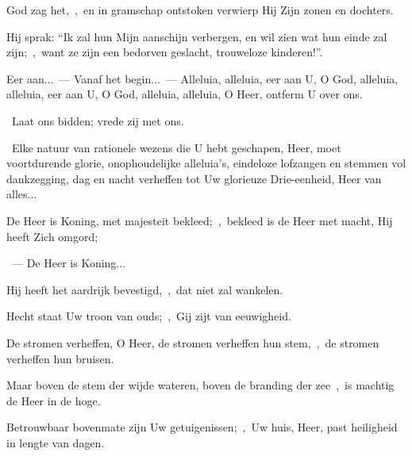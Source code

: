 \documentclass[12pt,twoside,a5paper]{article}
\begin{document}
\begin{halfparskip}

  God zag het,~\sep\ en in gramschap ontstoken verwierp Hij Zijn zonen en dochters.

  Hij sprak: ``Ik zal hun Mijn aanschijn verbergen, en wil zien wat hun einde zal zijn;~\sep\ want ze zijn een bedorven geslacht, trouweloze kinderen!''.
\end{halfparskip}


\begin{halfparskip}
  Eer aan...~--- Vanaf het begin...~--- Alleluia, alleluia, eer aan U, O God, alleluia, alleluia, eer aan U, O God, alleluia, alleluia, O Heer, ontferm U over ons.

  \dd~Laat ons bidden; vrede zij met ons.

  \cc~Elke natuur van rationele wezens die U hebt geschapen, Heer, moet voortdurende glorie, onophoudelijke alleluia's, eindeloze lofzangen en stemmen vol dankzegging, dag en nacht verheffen tot Uw glorieuze Drie-eenheid, Heer van alles...
\end{halfparskip}



\begin{halfparskip}
  De Heer is Koning, met majesteit bekleed;~\sep\ bekleed is de Heer met macht, Hij heeft Zich omgord;

  ~---  De Heer is Koning...

  Hij heeft het aardrijk bevestigd,~\sep\ dat niet zal wankelen.

  Hecht staat Uw troon van ouds;~\sep\ Gij zijt van eeuwigheid.

  De stromen verheffen, O Heer, de stromen verheffen hun stem,~\sep\ de stromen verheffen hun bruisen.

  Maar boven de stem der wijde wateren, boven de branding der zee~\sep\ is machtig de Heer in de hoge.

  Betrouwbaar bovenmate zijn Uw getuigenissen;~\sep\ Uw huis, Heer, past heiligheid in lengte van dagen.
\end{halfparskip}

\end{document}
